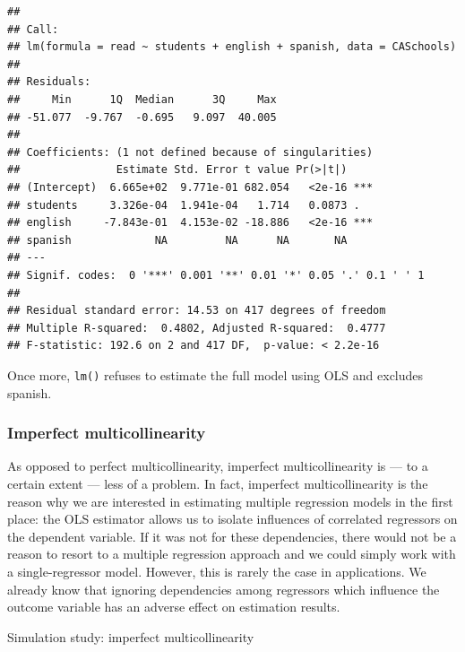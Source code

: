 \documentclass[]{book}
\begin{document}
\begin{verbatim}
## 
## Call:
## lm(formula = read ~ students + english + spanish, data = CASchools)
## 
## Residuals:
##     Min      1Q  Median      3Q     Max 
## -51.077  -9.767  -0.695   9.097  40.005 
## 
## Coefficients: (1 not defined because of singularities)
##               Estimate Std. Error t value Pr(>|t|)    
## (Intercept)  6.665e+02  9.771e-01 682.054   <2e-16 ***
## students     3.326e-04  1.941e-04   1.714   0.0873 .  
## english     -7.843e-01  4.153e-02 -18.886   <2e-16 ***
## spanish             NA         NA      NA       NA    
## ---
## Signif. codes:  0 '***' 0.001 '**' 0.01 '*' 0.05 '.' 0.1 ' ' 1
## 
## Residual standard error: 14.53 on 417 degrees of freedom
## Multiple R-squared:  0.4802, Adjusted R-squared:  0.4777 
## F-statistic: 192.6 on 2 and 417 DF,  p-value: < 2.2e-16
\end{verbatim}

Once more, \texttt{lm()} refuses to estimate the full model using OLS and excludes spanish.

\hypertarget{imperfect-multicollinearity}{%
\subsubsection{Imperfect multicollinearity}\label{imperfect-multicollinearity}}

As opposed to perfect multicollinearity, imperfect multicollinearity is --- to a certain extent --- less of a problem. In fact, imperfect multicollinearity is the reason why we are interested in estimating multiple regression models in the first place: the OLS estimator allows us to isolate influences of correlated regressors on the dependent variable. If it was not for these dependencies, there would not be a reason to resort to a multiple regression approach and we could simply work with a single-regressor model. However, this is rarely the case in applications. We already know that ignoring dependencies among regressors which influence the outcome variable has an adverse effect on estimation results.

Simulation study: imperfect multicollinearity
\end{document}
